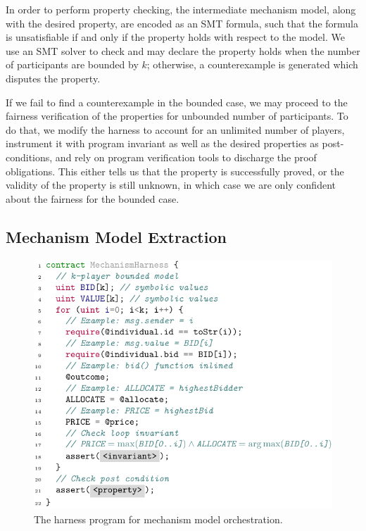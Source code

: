 In order to perform property checking, the intermediate mechanism model, along with the desired
property, are encoded as an SMT formula, such that the formula is unsatisfiable if and only if the
property holds with respect to the model.
We use an SMT solver to check and may declare the property holds when the number of participants
are bounded by $k$; otherwise, a counterexample is generated which disputes the property.

If we fail to find a counterexample in the bounded case, we may proceed to the fairness
verification of the properties for unbounded number of participants.
To do that, we modify the harness to account for an unlimited number of players, instrument it with
program invariant as well as the desired properties as post-conditions, and rely on program
verification tools to discharge the proof obligations.
This either tells us that the property is successfully proved, or the validity of the property is
still unknown, in which case we are only confident about the fairness for the bounded case.


\subsection{Mechanism Model Extraction} \label{subsec:ModelExtraction}

\begin{figure}[t]
\centering
\includegraphics[width=\columnwidth]{Figures/Chapter3/harness.pdf}
\caption{The harness program for mechanism model orchestration.}\label{fig:harness}
\end{figure}

